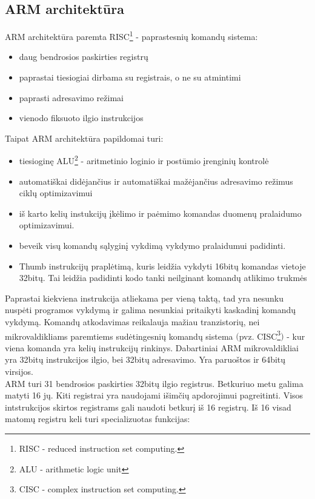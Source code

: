 \documentclass[a4paper, 12pt]{article} %
\begin{document}
\begin{onehalfspacing}
\newpage
\section{ARM architekt\={u}ra}
ARM architekt\={u}ra paremta RISC\footnote{RISC - reduced instruction set computing.} - paprastesni\k{u} komand\k{u} sistema:
\begin{itemize} 
\item daug bendrosios paskirties registr\k{u}
\item paprastai tiesiogiai dirbama su registrais, o ne su atmintimi
\item paprasti adresavimo re\v{z}imai
\item vienodo fiksuoto ilgio instrukcijos
\end{itemize} 
Taipat ARM architekt\={u}ra papildomai turi:
\begin{itemize}
\item tiesiogin\k{e} ALU\footnote{ALU - arithmetic logic unit} - aritmetinio loginio ir post\={u}mio \k{i}rengini\k{u} kontrol\.{e}
\item automati\v{s}kai did\.{e}jan\v{c}ius ir automati\v{s}kai ma\v{z}\.{e}jan\v{c}ius adresavimo re\v{z}imus cikl\k{u} optimizavimui
\item i\v{s} karto keli\k{u} instukcij\k{u} \k{i}k\.elimo ir pa\.{e}mimo komandas duomen\k{u} pralaidumo optimizavimui.
\item beveik vis\k{u} komand\k{u} s\k{a}lygin\k{i} vykdim\k{a} vykdymo pralaidumui padidinti.
\item Thumb instrukcij\k{u} prapl\.{e}tim\k{a}, kuris leid\v{z}ia vykdyti 16bit\k{u} komandas vietoje 32bit\k{u}. Tai leid\v{z}ia padidinti kodo tank{i} neilginant komand\k{u} atlikimo trukm\.{e}s
\end{itemize}
Paprastai kiekviena instrukcija atliekama per vien\k{a} takt\k{a}, tad yra nesunku nusp\.{e}ti programos vykdym\k{a} ir galima nesunkiai pritaikyti kaskadin\k{i} komand\k{u} vykdym\k{a}. Komand\k{u} atkodavimas reikalauja ma\v{z}iau tranzistori\k{u}, nei mikrovaldikliams paremtiems sud\.{e}tingesni\k{u} komand\k{u} sistema $($pvz. CISC\footnote{CISC - complex instruction set computing.}$)$ - kur viena komanda yra keli\k{u} instrukcij\k{u} rinkinys. Dabartiniai ARM mikrovaldikliai yra 32bit\k{u} instrukcijos ilgio, bei 32bit\k{u} adresavimo. Yra paruo\v{s}tos ir 64bit\k{u} virsijos. \\
\indent ARM turi 31 bendrosios paskirties 32bit\k{u} ilgio registrus. Betkuriuo metu galima matyti 16 j\k{u}. Kiti registrai yra naudojami i\v{s}im\v{c}i\k{u} apdorojimui pagreitinti. Visos intstrukcijos skirtos registrams gali naudoti betkur\k{i} i\v{s} 16 registr\k{u}. I\v{s} 16 visad matom\k{u} registru keli turi specializuotas funkcijas:

\end{onehalfspacing}
\end{document}
